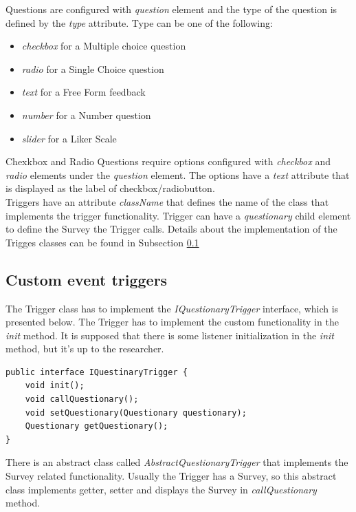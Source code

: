 Questions are configured with \textit{question} element and the type of the question is defined by the \textit{type} attribute. Type can be one of the following:
\begin{itemize}
\item \textit{checkbox} for a Multiple choice question
\item \textit{radio} for a Single Choice question
\item \textit{text} for a Free Form feedback
\item \textit{number} for a Number question
\item \textit{slider} for a Liker Scale
\end{itemize}
Chexkbox and Radio Questions require options configured with \textit{checkbox} and \textit{radio} elements under the \textit{question} element. The options have a \textit{text} attribute that is displayed as the label of checkbox/radiobutton.\\

Triggers have an attribute \textit{className} that defines the name of the class that implements the trigger functionality. Trigger can have a \textit{questionary} child element to define the Survey the Trigger calls. Details about the implementation of the Trigges classes can be found in Subsection \ref{subsec:triggers}\\

\subsection{Custom event triggers} \label{subsec:triggers}

The Trigger class has to implement the \textit{IQuestionaryTrigger} interface, which is presented below. The Trigger has to implement the custom functionality in the \textit{init} method. It is supposed that there is some listener initialization in the \textit{init} method, but it's up to the researcher.\\  

\lstset{language=Java} 
\begin{lstlisting}
public interface IQuestinaryTrigger {
    void init();
    void callQuestionary();
    void setQuestionary(Questionary questionary);
    Questionary getQuestionary();
}
\end{lstlisting}

There is an abstract class called \textit{AbstractQuestionaryTrigger} that implements the Survey related functionality. Usually the Trigger has a Survey, so this abstract class implements getter, setter and displays the  Survey in \textit{callQuestionary} method.\\


